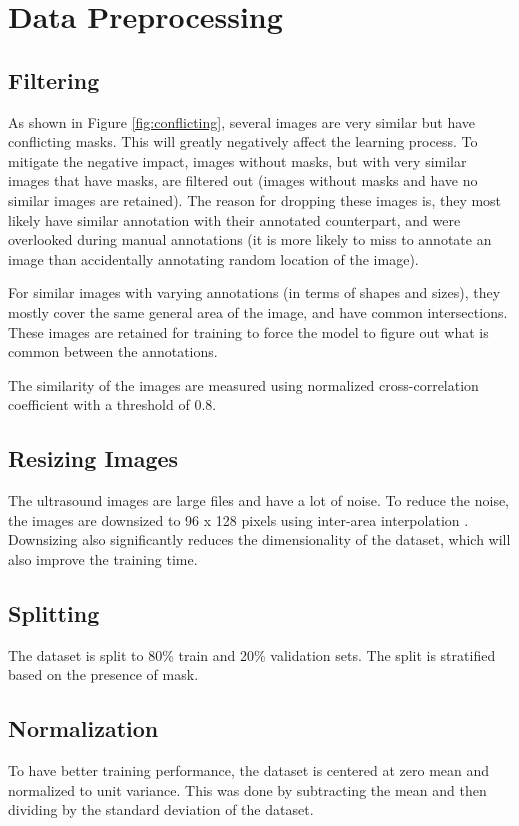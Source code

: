 \section{Data Preprocessing}

\subsection{Filtering}
As shown in Figure \ref{fig:conflicting}, several images are very similar but have conflicting masks. This will greatly negatively affect the learning process. To mitigate the negative impact, images without masks, but with very similar images that have masks, are filtered out (images without masks and have no similar images are retained). The reason for dropping these images is, they most likely have similar annotation with their annotated counterpart, and were overlooked during manual annotations (it is more likely to miss to annotate an image than accidentally annotating random location of the image).

For similar images with varying annotations (in terms of shapes and sizes), they mostly cover the same general area of the image, and have common intersections. These images are retained for training to force the model to figure out what is common between the annotations.

The similarity of the images are measured using normalized cross-correlation coefficient \cite{cross-correlation} with a threshold of 0.8.


\subsection{Resizing Images}
The ultrasound images are large files and have a lot of noise. To reduce the noise, the images are downsized to 96 x 128 pixels using inter-area interpolation \cite{GEAN:GEAN1135}. Downsizing also significantly reduces the dimensionality of the dataset, which will also improve the training time.

\subsection{Splitting}
The dataset is split to 80\% train and 20\% validation sets. The split is stratified based on the presence of mask.

\subsection{Normalization}
To have better training performance, the dataset is centered at zero mean and normalized to unit variance. This was done by subtracting the mean and then dividing by the standard deviation of the dataset.